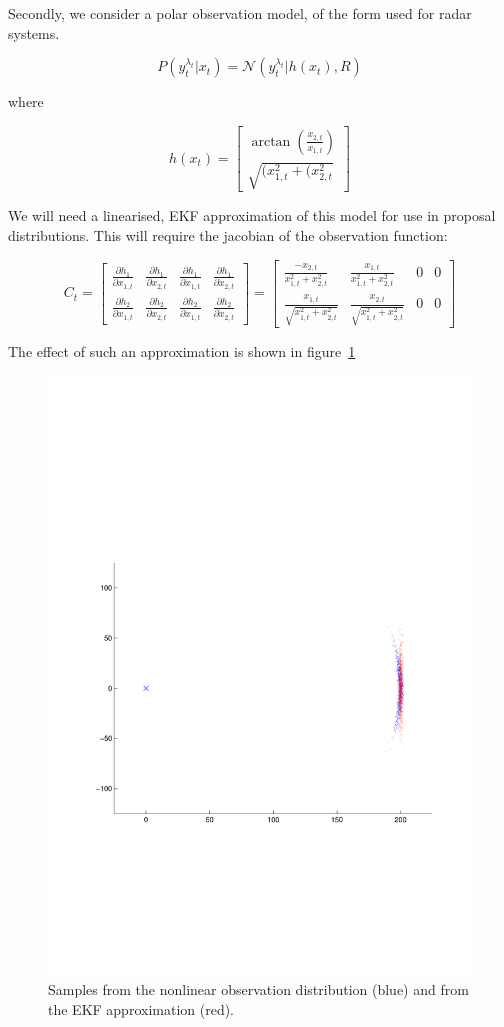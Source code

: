 Secondly, we consider a polar observation model, of the form used for radar systems.

\begin{equation}
P(y_t^{\lambda_t}|x_t) = \mathcal{N}(y_t^{\lambda_t}|h(x_t), R)
\label{eq:}
\end{equation}

where

\begin{equation}
h(x_t) = \begin{bmatrix}
\arctan \left( \frac{x_{2,t}}{x_{1,t}} \right)\\
\sqrt{ (x_{1,t}^2 + (x_{2,t}^2 }
\end{bmatrix}
\label{eq:}
\end{equation}

We will need a linearised, EKF approximation of this model for use in proposal distributions. This will require the jacobian of the observation function:

\begin{equation}
C_t = \begin{bmatrix} \frac{\partial h_1}{\partial x_{1,t}} & \frac{\partial h_1}{\partial x_{2,t}} & \frac{\partial h_1}{\partial \dot{x}_{1,t}} & \frac{\partial h_1}{\partial \dot{x}_{2,t}} \\ \frac{\partial h_2}{\partial x_{1,t}} & \frac{\partial h_2}{\partial x_{2,t}} & \frac{\partial h_2}{\partial \dot{x}_{1,t}} & \frac{\partial h_2}{\partial \dot{x}_{2,t}} \end{bmatrix}
= \begin{bmatrix} \frac{-x_{2,t}}{x_{1,t}^2 + x_{2,t}^2} & \frac{x_{1,t}}{x_{1,t}^2 + x_{2,t}^2} & 0 & 0 \\ \frac{x_{1,t}}{\sqrt{x_{1,t}^2 + x_{2,t}^2}} & \frac{x_{2,t}}{\sqrt{x_{1,t}^2 + x_{2,t}^2}} & 0 & 0 \end{bmatrix}
\label{eq:}
\end{equation}

The effect of such an approximation is shown in figure~\ref{fig:EKFradar}

\begin{figure}[!hbt] \centering
\includegraphics[width=0.7\columnwidth]{EKF.pdf}%
\caption{Samples from the nonlinear observation distribution (blue) and from the EKF approximation (red).}%
\label{fig:EKFradar}%
\end{figure}